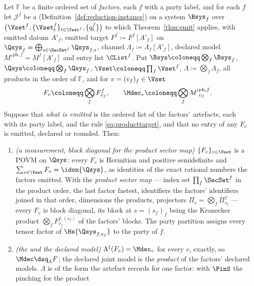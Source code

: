 \begin{theorem}
\label{thm:emitted-product}
Let $\mathbb{F}$ be a finite ordered set of \emph{factors}, each $f$ with a
party label, and for each $f$ let $\mathcal{J}^{f}$ be a
 (Definition~\ref{def:reduction-instance}) on a
system $\Bsys_f$ over
$\big(\Vset^{f},\{\Vset^{f}_{t}\}_{t\in\Tset^{f}},\{q^{f}_{t}\}\big)$ to
which Theorem~\ref{thm:emit} applies, with emitted datum $A'_f$, emitted
target $F^{f}\coloneqq F^{f}[A'_f]$ on
$\Qsys_f=\bigoplus_{s\in\SecSet^{f}}\Qsys_{f,s}$, channel
$\Lambda_f\coloneqq\Lambda_f[A'_f]$, declared model ${M'}^{\mathrm{ph},f}=M^{f}[A'_f]$
and entry list $\CList^{f}$. Put $\Bsys\coloneqq\bigotimes_f\Bsys_f$,
$\Qsys\coloneqq\bigotimes_f\Qsys_f$, $\Vset\coloneqq\prod_f\Vset^{f}$,
$\Lambda\coloneqq\bigotimes_f\Lambda_f$, all products in the order of
$\mathbb{F}$, and for $v=(v_f)_f\in\Vset$
\begin{equation}\label{eq:producttarget}
  F_v\coloneqq\bigotimes_{f}F^{f}_{v_f},\qquad
  \Mdec_v\coloneqq\bigotimes_{f}{M'}^{\mathrm{ph},f}_{v_f} .
\end{equation}
Suppose that \emph{what is emitted} is the ordered list of the factors'
artefacts, each with its party label, and the rule \eqref{eq:producttarget},
and that no entry of any $F_v$ is emitted, declared or rounded. Then:
\begin{enumerate}[label=(\roman*),leftmargin=3.0em]
\item \emph{(a measurement, block diagonal for the product sector map)}
  $\{F_v\}_{v\in\Vset}$ is a POVM on $\Qsys$: every $F_v$ is Hermitian and
  positive semidefinite and $\sum_{v\in\Vset}F_v=\idon{\Qsys}$, as identities
  of the exact rational numbers the factors emitted. With the \emph{product
  sector map} --- index set $\prod_f\SecSet^{f}$ in the product order, the
  last factor fastest, identifiers the factors' identifiers joined in that
  order, dimensions the products, projectors
  $\Pi_{s}=\bigotimes_f\Pi^{f}_{s_f}$ --- every $F_v$ is block diagonal, its
  block at $s=(s_f)_f$ being the Kronecker product
  $\bigotimes_fF^{f,(s_f)}_{v_f}$ of the factors' blocks. The party
  partition assigns every tensor factor of $\Hs{\Qsys_{f,s_f}}$ to the party
  of $f$.
\item \emph{(the  and the declared model)}
  $\Lambda^{\dagger}(F_v)=\Mdec_v$ for every $v$, exactly, so
  $\Mdec\dsq_{\Lambda}F$; the declared joint model is the \emph{product} of
  the factors' declared models. $\Lambda$ is of the form the artefact
  records for one factor: with $\PinS$ the pinching for the product

\end{enumerate}
\end{theorem}
